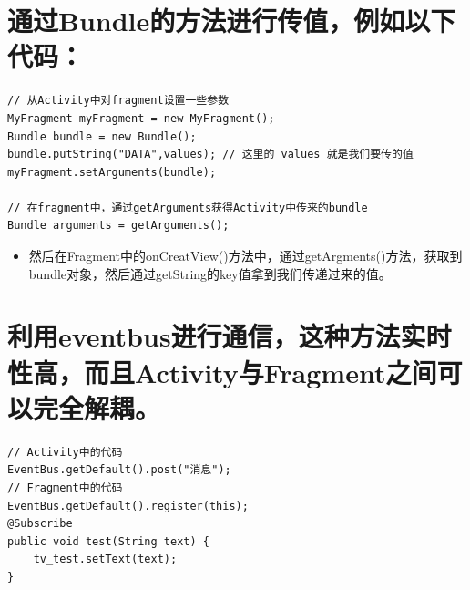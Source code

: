 \documentclass[9pt, b5paaper]{book}
\begin{document}
\section{通过Bundle的方法进行传值，例如以下代码：}
\label{sec-3-2}
\begin{verbatim}
// 从Activity中对fragment设置一些参数 
MyFragment myFragment = new MyFragment();
Bundle bundle = new Bundle();
bundle.putString("DATA",values); // 这里的 values 就是我们要传的值
myFragment.setArguments(bundle);

// 在fragment中，通过getArguments获得Activity中传来的bundle
Bundle arguments = getArguments();
\end{verbatim}
\begin{itemize}
\item 然后在Fragment中的onCreatView()方法中，通过getArgments()方法，获取到bundle对象，然后通过getString的key值拿到我们传递过来的值。
\end{itemize}
\section{利用eventbus进行通信，这种方法实时性高，而且Activity与Fragment之间可以完全解耦。}
\label{sec-3-3}
\begin{verbatim}
// Activity中的代码 
EventBus.getDefault().post("消息");  
// Fragment中的代码 
EventBus.getDefault().register(this); 
@Subscribe 
public void test(String text) { 
    tv_test.setText(text); 
}
\end{verbatim}
\end{document}

